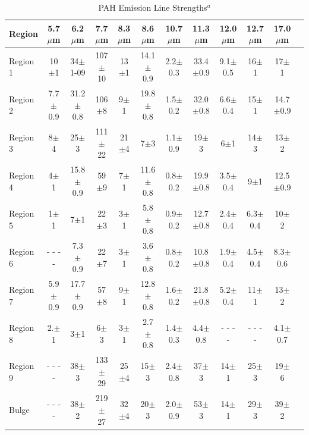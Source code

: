 \documentclass[useAMS,usenatbib,a4paper]{mn2e}
\begin{document}
\begin{table}
 \centering
 \begin{minipage}{200mm}
\caption{PAH Emission Line Strengths$^a$}
  \begin{tabular}{l c c  c  c  c  c  c  c  c  c c }
  \hline {Region  }&{5.7$\mu$m  }&{6.2$\mu$m  }&{7.7$\mu$m  }&{8.3$\mu$m  }&{8.6$\mu$m  }&{10.7$\mu$m  }&{11.3$\mu$m  }&{12.0$\mu$m  }&{12.7$\mu$m  }&{17.0$\mu$m  } 
   \\
 \hline



 Region 1 &10$\pm$1            & 34$\pm$1-09        & 107$\pm$10        & 13$\pm$1       & 14.1$\pm$0.9        & 2.2$\pm$0.3        & 33.4$\pm$0.9        & 9.1$\pm$0.5        & 16$\pm$1        & 17$\pm$1        \\
Region 2 &7.7$\pm$0.9        & 31.2$\pm$0.8        & 106$\pm$8        & 9$\pm$1           & 19.8$\pm$0.8        & 1.5$\pm$0.2        & 32.0$\pm$0.8        & 6.6$\pm$0.4        & 15$\pm$1        & 14.7$\pm$0.9        \\
Region 3 &8$\pm$4              & 25$\pm$3                & 111$\pm$22       & 21$\pm$4       & 7$\pm$3                 & 1.1$\pm$0.9        & 19$\pm$3             & 6$\pm$1             & 14$\pm$3           & 13$\pm$2        \\
Region 4 &4$\pm$1              & 15.8$\pm$0.9        & 59$\pm$9        & 7$\pm$1           & 11.6$\pm$0.8          & 0.8$\pm$0.2        & 19.9$\pm$0.8        & 3.5$\pm$0.4        & 9$\pm$1             & 12.5$\pm$0.9        \\
Region 5 &1$\pm$1              & 7$\pm$1                 & 22$\pm$3        & 3$\pm$1           & 5.8$\pm$0.8            & 0.9$\pm$0.2        & 12.7$\pm$0.8        & 2.4$\pm$0.4        & 6.3$\pm$0.4        & 10$\pm$2        \\
Region 6 & - - - -                      & 7.3$\pm$0.9         & 22$\pm$7        & 3$\pm$1            & 3.6$\pm$0.8            & 0.8$\pm$0.2        & 10.8$\pm$0.8        & 1.9$\pm$0.4        & 4.5$\pm$0.4        & 8.3$\pm$0.6        \\
Region 7 &5.9$\pm$0.9        & 17.7$\pm$0.9       & 57$\pm$8        & 9$\pm$1            & 12.8$\pm$0.8        & 1.6$\pm$0.2        & 21.8$\pm$0.8        & 5.2$\pm$0.4        & 11$\pm$1             & 13$\pm$2        \\
Region 8 &2.$\pm$1              & 3$\pm$1              & 6$\pm$3            & 3$\pm$1            & 2.7$\pm$0.8        & 1.4$\pm$0.3        & 4.4$\pm$0.8            & - - - -                      &  - - - -                       & 4.1$\pm$0.7        \\
Region 9 &  - - - -                     & 38$\pm$3          & 133$\pm$29        & 25$\pm$4        & 15$\pm$3            & 2.4$\pm$0.8        & 37$\pm$3               & 14$\pm$1             & 25$\pm$3        & 19$\pm$6        \\
Bulge       & - - - -                       & 38$\pm$2           & 219$\pm$27        & 32$\pm$4        & 20$\pm$3           & 2.0$\pm$0.9        & 53$\pm$3              & 14$\pm$1           & 29$\pm$3        & 39$\pm$2       \\


\end{tabular}
\end{minipage}
\end{table}
\end{document}

